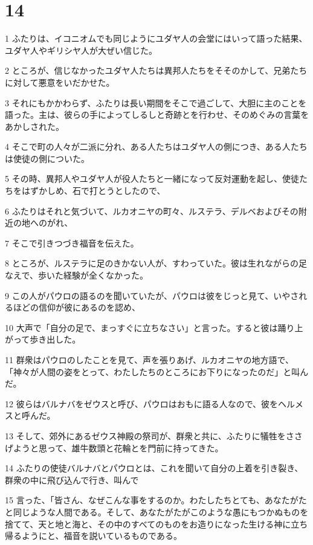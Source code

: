 \chapter{14}

\par 1 ふたりは、イコニオムでも同じようにユダヤ人の会堂にはいって語った結果、ユダヤ人やギリシヤ人が大ぜい信じた。
\par 2 ところが、信じなかったユダヤ人たちは異邦人たちをそそのかして、兄弟たちに対して悪意をいだかせた。
\par 3 それにもかかわらず、ふたりは長い期間をそこで過ごして、大胆に主のことを語った。主は、彼らの手によってしるしと奇跡とを行わせ、そのめぐみの言葉をあかしされた。
\par 4 そこで町の人々が二派に分れ、ある人たちはユダヤ人の側につき、ある人たちは使徒の側についた。
\par 5 その時、異邦人やユダヤ人が役人たちと一緒になって反対運動を起し、使徒たちをはずかしめ、石で打とうとしたので、
\par 6 ふたりはそれと気づいて、ルカオニヤの町々、ルステラ、デルベおよびその附近の地へのがれ、
\par 7 そこで引きつづき福音を伝えた。
\par 8 ところが、ルステラに足のきかない人が、すわっていた。彼は生れながらの足なえで、歩いた経験が全くなかった。
\par 9 この人がパウロの語るのを聞いていたが、パウロは彼をじっと見て、いやされるほどの信仰が彼にあるのを認め、
\par 10 大声で「自分の足で、まっすぐに立ちなさい」と言った。すると彼は踊り上がって歩き出した。
\par 11 群衆はパウロのしたことを見て、声を張りあげ、ルカオニヤの地方語で、「神々が人間の姿をとって、わたしたちのところにお下りになったのだ」と叫んだ。
\par 12 彼らはバルナバをゼウスと呼び、パウロはおもに語る人なので、彼をヘルメスと呼んだ。
\par 13 そして、郊外にあるゼウス神殿の祭司が、群衆と共に、ふたりに犠牲をささげようと思って、雄牛数頭と花輪とを門前に持ってきた。
\par 14 ふたりの使徒バルナバとパウロとは、これを聞いて自分の上着を引き裂き、群衆の中に飛び込んで行き、叫んで
\par 15 言った、「皆さん、なぜこんな事をするのか。わたしたちとても、あなたがたと同じような人間である。そして、あなたがたがこのような愚にもつかぬものを捨てて、天と地と海と、その中のすべてのものをお造りになった生ける神に立ち帰るようにと、福音を説いているものである。
